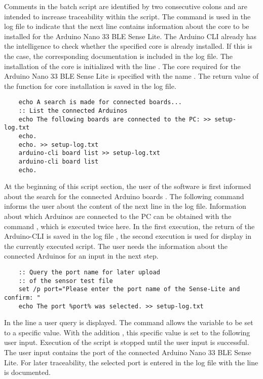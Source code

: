 Comments in the batch script are identified by two consecutive colons  and are intended to increase traceability within the script. The command  is used in the log file to indicate that the next line contains information about the core to be installed for the Arduino Nano 33 BLE Sense Lite. The Arduino CLI already has the intelligence to check whether the specified core is already installed. If this is the case, the corresponding documentation is included in the log file. The installation of the core is initialized with the line . The core required for the Arduino Nano 33 BLE Sense Lite is specified with the name . The return value of the function for core installation is saved in the log file.

\begin{lstlisting}
    echo A search is made for connected boards...
    :: List the connected Arduinos
    echo The following boards are connected to the PC: >> setup-log.txt
    echo.
    echo. >> setup-log.txt
    arduino-cli board list >> setup-log.txt
    arduino-cli board list
    echo.
\end{lstlisting}
At the beginning of this script section, the user of the software is first informed about the search for the connected Arduino boards . The following command  informs the user about the content of the next line in the log file. Information about which Arduinos are connected to the PC can be obtained with the command , which is executed twice here. In the first execution, the return of the Arduino-CLI is saved in the log file , the second execution is used for display in the currently executed script. The user needs the information about the connected Arduinos for an input in the next step.

\begin{lstlisting}
    :: Query the port name for later upload 
    :: of the sensor test file
    set /p port="Please enter the port name of the Sense-Lite and confirm: "
    echo The port %port% was selected. >> setup-log.txt
\end{lstlisting}
In the line  a user query is displayed. The command  allows the variable  to be set to a specific value. With the addition , this specific value is set to the following user input. Execution of the script is stopped until the user input is successful. The user input contains the port of the connected Arduino Nano 33 BLE Sense Lite. For later traceability, the selected port is entered in the log file with the line  is documented. 

